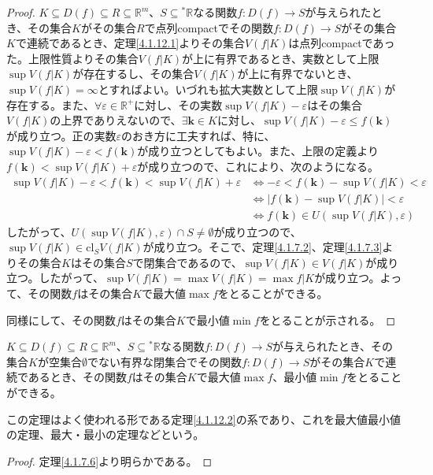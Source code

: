 \documentclass[dvipdfmx]{jsarticle}
\begin{document}
\begin{proof}
$K \subseteq D(f) \subseteq R \subseteq \mathbb{R}^{m}$、$S \subseteq{}^{*}\mathbb{R}$なる関数$f:D(f) \rightarrow S$が与えられたとき、その集合$K$がその集合$R$で点列compactでその関数$f:D(f) \rightarrow S$がその集合$K$で連続であるとき、定理\ref{4.1.12.1}よりその集合$V\left( f|K \right)$は点列compactであった。上限性質よりその集合$V\left( f|K \right)$が上に有界であるとき、実数として上限$\sup{V\left( f|K \right)}$が存在するし、その集合$V\left( f|K \right)$が上に有界でないとき、$\sup{V\left( f|K \right)} = \infty$とすればよい。いづれも拡大実数として上限$\sup{V\left( f|K \right)}$が存在する。また、$\forall\varepsilon \in \mathbb{R}^{+}$に対し、その実数$\sup{V\left( f|K \right)} - \varepsilon$はその集合$V\left( f|K \right)$の上界でありえないので、$\exists\mathbf{k} \in K$に対し、$\sup{V\left( f|K \right)} - \varepsilon \leq f\left( \mathbf{k} \right)$が成り立つ。正の実数$\varepsilon$のおき方に工夫すれば、特に、$\sup{V\left( f|K \right)} - \varepsilon < f\left( \mathbf{k} \right)$が成り立つとしてもよい。また、上限の定義より$f\left( \mathbf{k} \right) < \sup{V\left( f|K \right)} + \varepsilon$が成り立つので、これにより、次のようになる。
\begin{align*}
\sup{V\left( f|K \right)} - \varepsilon < f\left( \mathbf{k} \right) < \sup{V\left( f|K \right)} + \varepsilon &\Leftrightarrow - \varepsilon < f\left( \mathbf{k} \right) - \sup{V\left( f|K \right)} < \varepsilon\\
&\Leftrightarrow \left| f\left( \mathbf{k} \right) - \sup{V\left( f|K \right)} \right| < \varepsilon\\
&\Leftrightarrow f\left( \mathbf{k} \right) \in U\left( \sup{V\left( f|K \right)},\varepsilon \right)
\end{align*}
したがって、$U\left( \sup{V\left( f|K \right)},\varepsilon \right) \cap S \neq \emptyset$が成り立つので、$\sup{V\left( f|K \right)} \in \mathrm{cl}_{S}{V\left( f|K \right)}$が成り立つ。そこで、定理\ref{4.1.7.2}、定理\ref{4.1.7.3}よりその集合$K$はその集合$S$で閉集合であるので、$\sup{V\left( f|K \right)} \in V\left( f|K \right)$が成り立つ。したがって、$\sup{V\left( f|K \right)} = \max{V\left( f|K \right)} = \max{f|K}$が成り立つ。よって、その関数$f$はその集合$K$で最大値$\max f$をとることができる。\par
同様にして、その関数$f$はその集合$K$で最小値$\min f$をとることが示される。
\end{proof}
\begin{thm}[最大値最小値の定理]\label{4.1.12.3}
$K \subseteq D(f) \subseteq R \subseteq \mathbb{R}^{m}$、$S \subseteq{}^{*}\mathbb{R}$なる関数$f:D(f) \rightarrow S$が与えられたとき、その集合$K$が空集合$\emptyset$でない有界な閉集合でその関数$f:D(f) \rightarrow S$がその集合$K$で連続であるとき、その関数$f$はその集合$K$で最大値$\max f$、最小値$\min f$をとることができる。
\end{thm}\par
この定理はよく使われる形である定理\ref{4.1.12.2}の系であり、これを最大値最小値の定理、最大・最小の定理などという。
\begin{proof} 定理\ref{4.1.7.6}より明らかである。
\end{proof}
\end{document}

